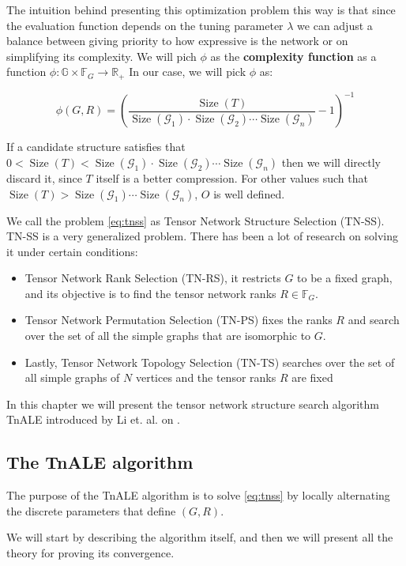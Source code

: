 \documentclass[11pt,a4paper,openright,oneside]{book}
\numberwithin{equation}{section}
\DeclareMathOperator{\size}{Size}
\begin{document}
{The intuition behind presenting this optimization problem this way is that since the evaluation function depends on the tuning parameter $\lambda$
we can adjust a balance between giving priority to how expressive is the network or on 
simplifying its complexity. We will pich $\phi$ as the \textbf{complexity function} as a function $\phi : \mathbb{G} \times \mathbb{F}_G \rightarrow \mathbb{R}_+$
In our case, we will pick $\phi$ as:

$$\phi(G, R) = \left(\frac{\size(T)}{\size(\mathcal{G}_1) \cdot \size(\mathcal{G}_2) \cdots \size(\mathcal{G}_n)} - 1\right)^{-1}$$

If a candidate structure satisfies that $0 < \size(T) < \size(\mathcal{G}_1) \cdot \size(\mathcal{G}_2) \cdots \size(\mathcal{G}_n)$
then we will directly discard it, since $T$ itself is a better compression. For other values such that $\size(T) > \size(\mathcal{G}_1) \cdots \size(\mathcal{G}_n)$, $O$ is
well defined.

We call the problem \ref{eq:tnss} as Tensor Network Structure Selection (\gls{TN-SS}). TN-SS is a very generalized problem.
There has been a lot of research on solving it under certain conditions:
\begin{itemize}
    \item Tensor Network Rank Selection (\gls{TN-RS}), it restricts $G$ to be a fixed graph, and its objective is to find the
tensor network ranks $R \in \mathbb{F}_G$.
\item Tensor Network Permutation Selection (\gls{TN-PS}) fixes the ranks $R$ and search over the set
of all the simple graphs that are isomorphic to $G$.
\item Lastly, Tensor Network Topology Selection (\gls{TN-TS}) searches over the set of all simple graphs of $N$ vertices and
        the tensor ranks $R$ are fixed
\end{itemize}

In this chapter we will present the tensor network structure search algorithm \gls{TnALE}
introduced by Li et. al. on \cite{liAlternatingLocalEnumeration2023a}.

\subsection{The TnALE algorithm}

The purpose of the \gls{TnALE} algorithm is to solve \ref{eq:tnss} by locally alternating the discrete parameters that define $(G, R)$.

We will start by describing the algorithm itself, and then we will present all the theory for proving its convergence.

}
\end{document}
